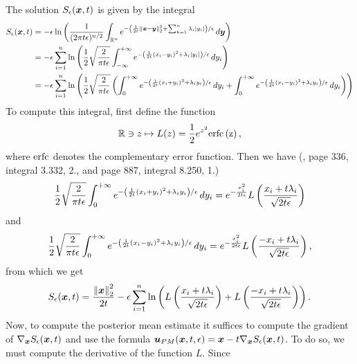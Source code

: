 \begin{example}
The solution $S_\epsilon(\boldsymbol{x},t)$ is given by the integral
\begin{align*}
S_{\epsilon}(\boldsymbol{x},t) & =-\epsilon\ln\left(\frac{1}{(2\pi t\epsilon)^{n/2}}\int_{\mathbb{R}^n}e^{-\left(\frac{1}{2t}\left\Vert \boldsymbol{x}-\boldsymbol{y}\right\Vert _{2}^{2}+\sum_{k=1}^{n}\lambda_{i}\left|y_{i}\right|\right)/\epsilon}\mathop{}\!d\boldsymbol{y}\right)\\
 & =-\epsilon\sum_{i=1}^{n}\ln\left(\frac{1}{2}\sqrt{\frac{2}{\pi t\epsilon}}\int_{-\infty}^{+\infty}e^{-\left(\frac{1}{2t}(x_{i}-y_i)^{2}+\lambda_{i}\left|y_i\right|\right)/\epsilon}\mathop{}\!d y_i\right)\\
 & =-\epsilon\sum_{i=1}^{n}\ln\left(\frac{1}{2}\sqrt{\frac{2}{\pi t\epsilon}}\left(\int_{0}^{+\infty}e^{-\left(\frac{1}{2t}(x_{i}+y_i)^{2}+\lambda_{i}y_i\right)/\epsilon}\mathop{}\!d y_i + \int_{0}^{+\infty}e^{-\left(\frac{1}{2t}(x_{i}-y_i)^{2}+\lambda_{i}y_i\right)/\epsilon}\mathop{}\!d y_i\right)\right)
\end{align*}
To compute this integral, first define the function
\begin{equation*}
    \mathbb{R} \ni z \mapsto L(z) = \frac{1}{2}e^{z^2}\rm erfc\left(z\right),
\end{equation*}
where $\rm erfc$ denotes the complementary error function. Then we have (\citep{gradshte2007table}, page 336, integral 3.332, 2., and page 887, integral 8.250, 1.)
\begin{equation*}
    \frac{1}{2}\sqrt{\frac{2}{\pi t\epsilon}}\int_{0}^{+\infty}e^{-\left(\frac{1}{2t}(x_{i}+y_i)^{2}+\lambda_{i}y_i\right)/\epsilon}\mathop{}\!d y_i = e^{-\frac{x_{i}^2}{2t\epsilon}}L\left(\frac{x_i + t\lambda_i}{\sqrt{2t\epsilon}}\right)
\end{equation*}
and
\begin{equation*}
    \frac{1}{2}\sqrt{\frac{2}{\pi t\epsilon}}\int_{0}^{+\infty}e^{-\left(\frac{1}{2t}(x_{i}-y_i)^{2}+\lambda_{i}y_i\right)/\epsilon}\mathop{}\!d y_i = e^{-\frac{x_{i}^2}{2t\epsilon}}L\left(\frac{-x_i + t\lambda_i}{\sqrt{2t\epsilon}}\right),
\end{equation*}
from which we get
\begin{equation*}
S_{\epsilon}(\boldsymbol{x},t)=\frac{\left\Vert \boldsymbol{x}\right\Vert _{2}^{2}}{2t} -\epsilon\sum_{i=1}^{n}\ln\left(L\left(\frac{x_i + t\lambda_i}{\sqrt{2t\epsilon}}\right) + L\left(\frac{-x_i + t\lambda_i}{\sqrt{2t\epsilon}}\right)\right).
\end{equation*}
Now, to compute the posterior mean estimate it suffices to compute the gradient of $\nabla_{\boldsymbol{x}}S_\epsilon(\boldsymbol{x},t)$ and use the formula $\boldsymbol{u}_{PM}(\boldsymbol{x},t,\epsilon) = \boldsymbol{x} - t\nabla_{\boldsymbol{x}}S_\epsilon(\boldsymbol{x},t)$. To do so, we must compute the derivative of the function $L$. Since 

\end{example}
